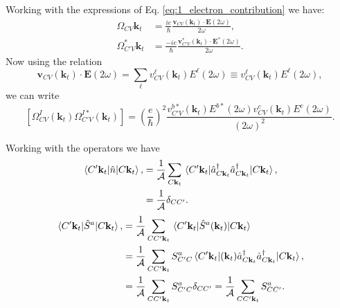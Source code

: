 \documentclass{article}
\newcommand{\kt}{\mathbf{k}_{t}}
\begin{document}
Working with the expressions of Eq. \eqref{eq:1_electron_contribution}
we have: 
\begin{align*}\label{eq:omegaICV_omegaI*VpV}
\Omega_{CV}{\kt} &= \frac{ie}{\hbar}
\frac{\mathbf{v}_{CV}(\kt) \cdot \mathbf{E}(2\omega)}{2\omega} , \\
\Omega^{*}_{C'V}{\kt} &= \frac{-ie}{\hbar}
\frac{\mathbf{v}^{*}_{C'V}(\kt) \cdot \mathbf{E}^{*}(2\omega)}{2\omega} .
\end{align*}
Now using the relation
\begin{equation}\label{eq:dot_product}
\mathbf{v}_{CV}(\kt) \cdot \mathbf{E}(2\omega)
= \sum_{\ell} v^{\ell}_{CV}(\kt) E^{\ell}(2\omega) \equiv v^{\ell}_{CV}(\kt)
E^{\ell}(2\omega) ,
\end{equation}
we can write 
\begin{equation}\label{eq:omegaICV_omegaI*VpV_product}
[\Omega^{I}_{CV}(\kt) \Omega^{I*}_{C'V}(\kt)] =
\left( \frac{e}{\hbar} \right)^{2} 
\frac{v^{b*}_{C'V}(\kt)E^{b*}(2\omega)v^{c}_{CV}(\kt)E^{c}(2\omega)}{(2\omega)^{2}} .
\end{equation}

Working with the operators we have 
\begin{align}\label{eq:op_n}
\mel*{C'\kt}{\hat{n}}{C\kt} ,
&= \frac{1}{\mathcal{A}} \sum_{C\kt} 
\mel*{C'\kt}{\hat{a}^{\dag}_{C\kt} \hat{a}^{\dag}_{C\kt}}{C\kt} , \nonumber \\
&= \frac{1}{\mathcal{A}} \delta_{CC'} .
\end{align}
\begin{align}\label{eq:op_S}
\mel*{C'\kt}{\hat{S}^{a}}{C\kt} ,
&= \frac{1}{\mathcal{A}} \sum_{CC'\kt} \mel*{C'\kt}{\hat{S}^{a}(\kt)}{C\kt} \nonumber \\
&= \frac{1}{\mathcal{A}} \sum_{CC'\kt} S^{a}_{C'C} \mel*{C'\kt}{(\kt)\hat{a}^{\dag}_{C\kt} 
\hat{a}^{\dag}_{C\kt}}{C\kt} , \nonumber \\
&= \frac{1}{\mathcal{A}} \sum_{CC'\kt} S^{a}_{C'C} \delta_{CC'} = 
\frac{1}{\mathcal{A}} \sum_{CC'\kt} S^{a}_{CC'} .
\end{align}
\end{document}
